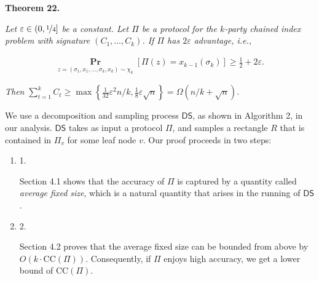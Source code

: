 \documentclass[10pt,a4paper]{article}
\begin{document}


\par\medskip\noindent\textbf{
\textbf{Theorem 22}\textbf{.}
}\par



\emph{Let $\varepsilon\in(0,\nicefrac{{1}}{{4}}]$ be a constant.
Let $\Pi$ be a protocol for the $k$-party chained index problem with signature $(C_{1},\dots,C_{k})$.
If $\Pi$ has $2\varepsilon$ advantage, i.e.,}\par


\[\begin{gathered}
\operatorname*{\mathbf{Pr}}_{z=(\sigma_{1},x_{1},\dots,\sigma_{k},x_{k})\sim\chi_{k}}\left[\Pi(z)=x_{k-1}(\sigma_{k})\right]\geq\frac{1}{2}+2\varepsilon.
\end{gathered}\]


\emph{Then $\sum_{t=1}^{k}C_{t}\geq\max\left\{\frac{1}{32}\varepsilon^{2}n/k,\frac{1}{8}\varepsilon\sqrt{n}\right\}=\Omega(n/k+\sqrt{n})$.}\par






We use a decomposition and sampling process $\mathsf{DS}$, as shown in Algorithm 2, in our analysis.
$\mathsf{DS}$ takes as input a protocol $\Pi$,
and samples a rectangle $R$ that is contained in $\Pi_{v}$ for some leaf node $v$.
Our proof proceeds in two steps:\par


\begin{enumerate}


\item[] 
1. 


Section 4.1 shows that the accuracy of $\Pi$ is captured by a quantity called \emph{average fixed size}, which is a natural quantity that arises in the running of $\mathsf{DS}$.\par





\item[] 
2. 


Section 4.2 proves that the average fixed size can be bounded from above by $O(k\cdot\mathrm{CC}(\Pi))$. Consequently, if $\Pi$ enjoys high accuracy, we get a lower bound of $\mathrm{CC}(\Pi)$.\par





\end{enumerate}
\end{document}
